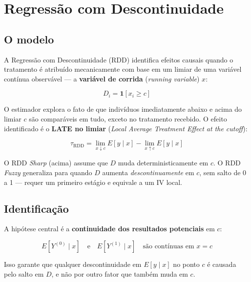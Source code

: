 \chapter{Regressão com Descontinuidade}
\label{cap:rdd}

\section{O modelo}

A Regressão com Descontinuidade (RDD) identifica efeitos causais quando o
tratamento é atribuído mecanicamente com base em um limiar de uma variável
contínua observável — a \textbf{variável de corrida} (\emph{running variable})
$x$:

\[
  D_i = \mathbf{1}[x_i \geq c]
\]

O estimador explora o fato de que indivíduos imediatamente abaixo e acima do
limiar $c$ são comparáveis em tudo, exceto no tratamento recebido. O efeito
identificado é o \textbf{LATE no limiar} (\emph{Local Average Treatment
Effect at the cutoff}):

\[
  \tau_{\mathrm{RDD}}
  = \lim_{x \downarrow c} E[y \mid x]
  - \lim_{x \uparrow c} E[y \mid x]
\]

\begin{nota}
  O RDD \emph{Sharp} (acima) assume que $D$ muda deterministicamente em $c$.
  O RDD \emph{Fuzzy} generaliza para quando $D$ aumenta
  \emph{descontinuamente} em $c$, sem salto de 0 a 1 — requer um primeiro
  estágio e equivale a um IV local.
\end{nota}

\section{Identificação}

A hipótese central é a \textbf{continuidade dos resultados potenciais} em
$c$:

\[
  E[Y^{(0)} \mid x] \quad \text{e} \quad E[Y^{(1)} \mid x]
  \quad \text{são contínuas em } x = c
\]

Isso garante que qualquer descontinuidade em $E[y \mid x]$ no ponto $c$ é
causada pelo salto em $D$, e não por outro fator que também muda em $c$.

